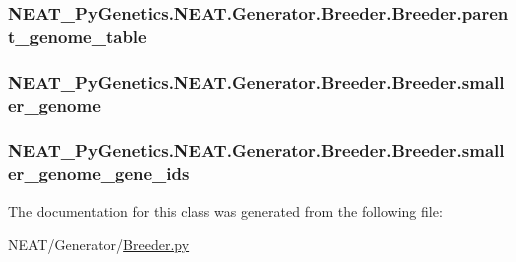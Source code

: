 \subsubsection[{\texorpdfstring{parent\+\_\+genome\+\_\+table}{parent_genome_table}}]{\setlength{\rightskip}{0pt plus 5cm}N\+E\+A\+T\+\_\+\+Py\+Genetics.\+N\+E\+A\+T.\+Generator.\+Breeder.\+Breeder.\+parent\+\_\+genome\+\_\+table\hspace{0.3cm}{\ttfamily [static]}}\hypertarget{classNEAT__PyGenetics_1_1NEAT_1_1Generator_1_1Breeder_1_1Breeder_a57dfe8e0f1eff1f6ef84492bc845dd40}{}\label{classNEAT__PyGenetics_1_1NEAT_1_1Generator_1_1Breeder_1_1Breeder_a57dfe8e0f1eff1f6ef84492bc845dd40}
\subsubsection[{\texorpdfstring{smaller\+\_\+genome}{smaller_genome}}]{\setlength{\rightskip}{0pt plus 5cm}N\+E\+A\+T\+\_\+\+Py\+Genetics.\+N\+E\+A\+T.\+Generator.\+Breeder.\+Breeder.\+smaller\+\_\+genome\hspace{0.3cm}{\ttfamily [static]}}\hypertarget{classNEAT__PyGenetics_1_1NEAT_1_1Generator_1_1Breeder_1_1Breeder_aee42ab257302cbcf2e6619111289c489}{}\label{classNEAT__PyGenetics_1_1NEAT_1_1Generator_1_1Breeder_1_1Breeder_aee42ab257302cbcf2e6619111289c489}
\subsubsection[{\texorpdfstring{smaller\+\_\+genome\+\_\+gene\+\_\+ids}{smaller_genome_gene_ids}}]{\setlength{\rightskip}{0pt plus 5cm}N\+E\+A\+T\+\_\+\+Py\+Genetics.\+N\+E\+A\+T.\+Generator.\+Breeder.\+Breeder.\+smaller\+\_\+genome\+\_\+gene\+\_\+ids\hspace{0.3cm}{\ttfamily [static]}}\hypertarget{classNEAT__PyGenetics_1_1NEAT_1_1Generator_1_1Breeder_1_1Breeder_a1b7a43f5e5d325a0581e90e5666cc424}{}\label{classNEAT__PyGenetics_1_1NEAT_1_1Generator_1_1Breeder_1_1Breeder_a1b7a43f5e5d325a0581e90e5666cc424}


The documentation for this class was generated from the following file\+:\begin{DoxyCompactItemize}
\item 
N\+E\+A\+T/\+Generator/\hyperlink{Breeder_8py}{Breeder.\+py}\end{DoxyCompactItemize}
